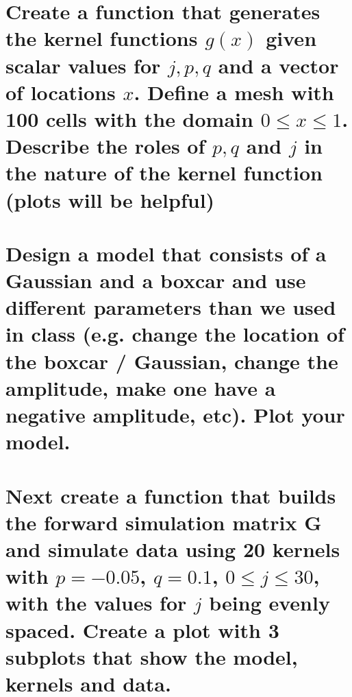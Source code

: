 \documentclass[twoside]{EOSC454} %
\begin{document}
\pagebreak


\part{
    Create a function that generates the kernel functions $g(x)$ given scalar values for $j, p, q$ and a vector of locations $x$. Define a mesh with 100 cells with the domain $0 \leq x \leq 1$. Describe the roles of $p, q$ and $j$ in the nature of the kernel function (plots will be helpful)
}

\part{
    Design a model that consists of a Gaussian and a boxcar and use different parameters than we used in class (e.g. change the location of the boxcar / Gaussian, change the amplitude, make one have a negative amplitude, etc). Plot your model.
}

\part{
    Next create a function that builds the forward simulation matrix $\mathbf{G}$ and simulate data using 20 kernels with $p = -0.05$, $q = 0.1$, $0 \leq j \leq 30$, with the values for $j$ being evenly spaced. Create a plot with 3 subplots that show the model, kernels and data.
}
\end{document}
